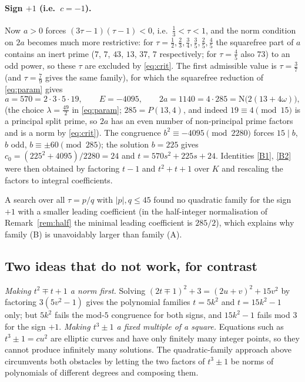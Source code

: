 \documentclass[11pt]{article}
\theoremstyle{remark}
\newcommand{\N}{\mathrm{N}}
\begin{document}
\paragraph{Sign $+1$ (i.e.\ $c=-1$).}
Now $a>0$ forces $(3\tau-1)(\tau-1)<0$, i.e.\ $\tfrac13<\tau<1$, and the norm condition on $2a$
becomes much more restrictive: for $\tau=\tfrac12,\tfrac23,\tfrac34,\tfrac35,\tfrac25,\tfrac45$ the
squarefree part of $a$ contains an inert prime ($7$, $7$, $43$, $13$, $37$, $7$ respectively; for $\tau=\tfrac45$ also $73$) to an odd
power, so these $\tau$ are excluded by \eqref{eq:crit}. The first admissible value is $\tau=\tfrac37$
(and $\tau=\tfrac79$ gives the same family), for which the squarefree reduction of \eqref{eq:param} gives
\[
a=570=2\cdot3\cdot5\cdot19,\qquad E=-4095,\qquad 2a=1140=4\cdot285=\N\bigl(2(13+4\omega)\bigr),
\]
(the choice $\lambda=\tfrac{49}{2}$ in \eqref{eq:param}; $285=P(13,4)$, and indeed $19\equiv4\pmod{15}$ is a
principal split prime, so $2a$ has an even number of non-principal prime factors and is a norm by \eqref{eq:crit}). The congruence $b^{2}\equiv-4095\pmod{2280}$
forces $15\mid b$, $b$ odd, $b\equiv\pm60\pmod{285}$; the solution $b=225$ gives
$c_{0}=(225^{2}+4095)/2280=24$ and $t=570s^{2}+225s+24$. Identities \eqref{B1}, \eqref{B2} were then
obtained by factoring $t-1$ and $t^{2}+t+1$ over $K$ and rescaling the factors to integral coefficients.

A search over all $\tau=p/q$ with $|p|,q\le45$ found no quadratic family for the sign $+1$ with a smaller
leading coefficient (in the half-integer normalisation of Remark~\ref{rem:half} the minimal leading
coefficient is $285/2$), which explains why family (B) is unavoidably larger than family (A).

\subsection{Two ideas that do not work, for contrast}
\emph{Making $t^{2}\mp t+1$ a norm first.} Solving $(2t\mp1)^{2}+3=(2u+v)^{2}+15v^{2}$ by factoring
$3(5v^{2}-1)$ gives the polynomial families $t=5k^{2}$ and $t=15k^{2}-1$ only; but $5k^{2}$ fails the
mod-$5$ congruence for both signs, and $15k^{2}-1$ fails mod $3$ for the sign $+1$.
\emph{Making $t^{3}\pm1$ a fixed multiple of a square.} Equations such as $t^{3}\pm1=cu^{2}$ are elliptic
curves and have only finitely many integer points, so they cannot produce infinitely many solutions.
The quadratic-family approach above circumvents both obstacles by letting the two factors of $t^{3}\pm1$ be
norms of polynomials of different degrees and composing them.
\end{document}
